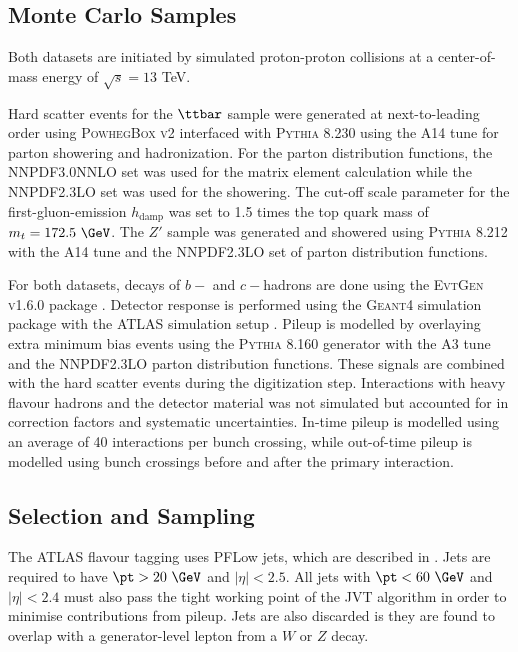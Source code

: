 \subsection{Monte Carlo Samples}

Both datasets are initiated by simulated proton-proton collisions at a center-of-mass energy of $\sqrt{s} = 13$ TeV.

Hard scatter events for the $\ttbar$ sample were generated at next-to-leading order using \textsc{PowhegBox v2} \cite{Powheg1, Powheg2, Powheg3} interfaced with \textsc{Pythia 8.230} \cite{Pythia8} using the \textsc{A14} tune \cite{A14} for parton showering and hadronization.
For the parton distribution functions, the \textsc{NNPDF3.0NNLO} \cite{PDF3.0} set was used for the matrix element calculation while the \textsc{NNPDF2.3LO} \cite{PDF2.3} set was used for the showering.
The cut-off scale parameter for the first-gluon-emission $h_{\text{damp}}$ was set to 1.5 times the top quark mass of $m_t = 172.5~\GeV$.
The $Z'$ sample was generated and showered using \textsc{Pythia 8.212} with the \textsc{A14} tune and the \textsc{NNPDF2.3LO} set of parton distribution functions.

For both datasets, decays of $b-$ and $c-$hadrons are done using the \textsc{EvtGen v1.6.0} package \cite{EvtGen}.
Detector response is performed using the \textsc{Geant4} simulation package \cite{Geant4} with the \textsc{ATLAS} simulation setup \cite{ATLASSim}.
Pileup is modelled by overlaying extra minimum bias events using the \textsc{Pythia 8.160} generator with the \textsc{A3} tune \cite{A3} and the \textsc{NNPDF2.3LO} parton distribution functions.
These signals are combined with the hard scatter events during the digitization step.
Interactions with heavy flavour hadrons and the detector material was not simulated but accounted for in correction factors and systematic uncertainties.
In-time pileup is modelled using an average of 40 interactions per bunch crossing, while out-of-time pileup is modelled using bunch crossings before and after the primary interaction.

\subsection{Selection and Sampling}

The ATLAS flavour tagging uses PFLow jets, which are described in .
Jets are required to have $\pt > 20~\GeV$ and $|\eta| < 2.5$.
All jets with $\pt < 60~\GeV$ and $|\eta| < 2.4$ must also pass the tight working point of the JVT algorithm in order to minimise contributions from pileup.
Jets are also discarded is they are found to overlap with a generator-level lepton from a $W$ or $Z$ decay.

